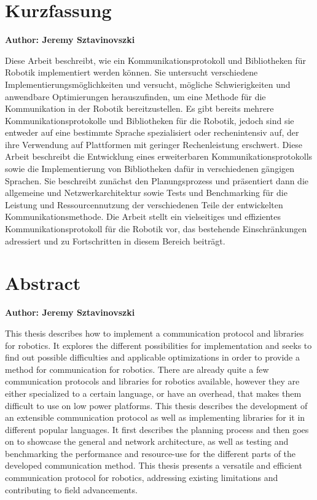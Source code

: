 

\chapter{Kurzfassung}
\textbf{Author: Jeremy Sztavinovszki}

\vspace{10mm}
Diese Arbeit beschreibt, wie ein Kommunikationsprotokoll und Bibliotheken für Robotik 
implementiert werden können. Sie untersucht verschiedene Implementierungsmöglichkeiten 
und versucht, mögliche Schwierigkeiten und anwendbare Optimierungen herauszufinden, um
eine Methode für die Kommunikation in der Robotik bereitzustellen. Es gibt bereits mehrere 
Kommunikationsprotokolle und Bibliotheken für die Robotik, jedoch sind sie entweder auf eine
bestimmte Sprache spezialisiert oder rechenintensiv auf, der ihre Verwendung 
auf Plattformen mit geringer Rechenleistung erschwert. Diese Arbeit beschreibt die Entwicklung
eines erweiterbaren Kommunikationsprotokolls sowie die Implementierung von Bibliotheken dafür
in verschiedenen gängigen Sprachen. Sie beschreibt zunächst den Planungsprozess und 
präsentiert dann die allgemeine und Netzwerkarchitektur sowie Tests und Benchmarking für
die Leistung und Ressourcennutzung der verschiedenen Teile der entwickelten Kommunikationsmethode.
Die Arbeit stellt ein vielseitiges und effizientes Kommunikationsprotokoll für die Robotik vor,
das bestehende Einschränkungen adressiert und zu Fortschritten in diesem Bereich beiträgt.

\chapter{Abstract}
\textbf{Author: Jeremy Sztavinovszki}

\vspace{10mm}

This thesis describes how to implement a communication protocol and libraries for robotics. 
It explores the different possibilities for implementation and seeks to find out possible 
difficulties and applicable  optimizations in order to provide a method for communication 
for robotics. There are already  quite a few communication protocols and libraries for 
robotics available, however they are either specialized to a certain language, or have an 
overhead, that makes them difficult to use on low power platforms. This thesis describes
the development of an extensible communication protocol as well as implementing libraries 
for it in different popular languages. It first describes the planning process and then
goes on to showcase the general and network architecture, as well as testing and benchmarking 
the performance and resource-use for the different parts of the developed communication
method. This thesis presents a versatile and efficient communication protocol for robotics,
addressing existing limitations and contributing to field advancements.


